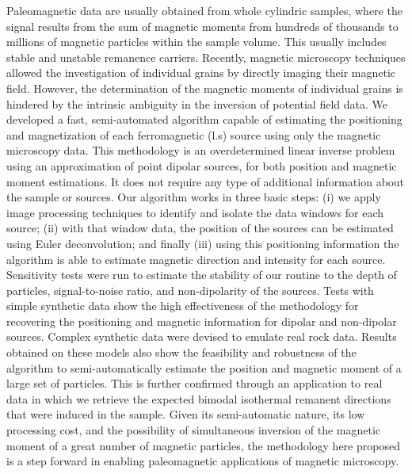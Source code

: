 Paleomagnetic data are usually obtained from whole cylindric samples, where the signal results from the sum of magnetic moments from hundreds of thousands to millions of magnetic particles within the sample volume. This usually includes stable and unstable remanence carriers. Recently, magnetic microscopy techniques allowed the investigation of individual grains by directly imaging their magnetic field. However, the determination of the magnetic moments of individual grains is hindered by the intrinsic ambiguity in the inversion of potential field data. We developed a fast, semi-automated algorithm capable of estimating the positioning and magnetization of each ferromagnetic (l.s) source using only the magnetic microscopy data. This methodology is an overdetermined linear inverse problem using an approximation of point dipolar sources, for both position and magnetic moment estimations. It does not require any type of additional information about the sample or sources. Our algorithm works in three basic steps: (i) we apply image processing techniques to identify and isolate the data windows for each source; (ii) with that window data, the position of the sources can be estimated using Euler deconvolution; and finally (iii) using this positioning information the algorithm is able to estimate magnetic direction and intensity for each source. Sensitivity tests were run to estimate the stability of our routine to the depth of particles, signal-to-noise ratio, and non-dipolarity of the sources. Tests with simple synthetic data show the high effectiveness of the methodology for recovering the positioning and magnetic information for dipolar and non-dipolar sources. Complex synthetic data were devised to emulate real rock data. Results obtained on these models also show the feasibility and robustness of the algorithm to semi-automatically estimate the position and magnetic moment of a large set of particles. This is further confirmed through an application to real data in which we retrieve the expected bimodal isothermal remanent directions that were induced in the sample. Given its semi-automatic nature, its low processing cost, and the possibility of simultaneous inversion of the magnetic moment of a great number of magnetic particles, the methodology here proposed is a step forward in enabling paleomagnetic applications of magnetic microscopy.